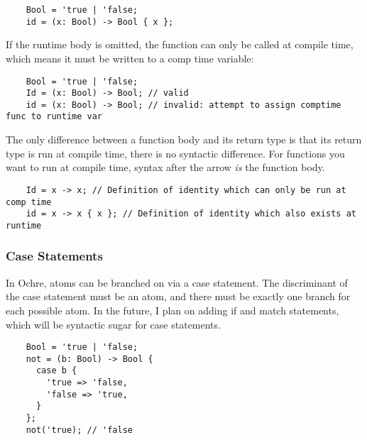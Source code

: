 \documentclass[12pt,twoside]{report}
\begin{document}
  \begin{verbatim}
    Bool = 'true | 'false;
    id = (x: Bool) -> Bool { x };
  \end{verbatim}

If the runtime body is omitted, the function can only be called at compile time, which means it must be written to a comp time variable:

\begin{listing}[H]
  \begin{verbatim}
    Bool = 'true | 'false;
    Id = (x: Bool) -> Bool; // valid
    id = (x: Bool) -> Bool; // invalid: attempt to assign comptime func to runtime var
  \end{verbatim}
\end{listing}

The only difference between a function body and its return type is that its return type is run at compile time, there is no syntactic difference. For functions you want to run at compile time, syntax after the arrow \textit{is} the function body.

  \begin{verbatim}
    Id = x -> x; // Definition of identity which can only be run at comp time
    id = x -> x { x }; // Definition of identity which also exists at runtime
  \end{verbatim}

\subsubsection{Case Statements}
In Ochre, atoms can be branched on via a case statement. The discriminant of the case statement must be an atom, and there must be exactly one branch for each possible atom. In the future, I plan on adding if and match statements, which will be syntactic sugar for case statements.

  \begin{verbatim}
    Bool = 'true | 'false;
    not = (b: Bool) -> Bool {
      case b {
        'true => 'false,
        'false => 'true,
      }
    };
    not('true); // 'false
  \end{verbatim}
\end{document}

